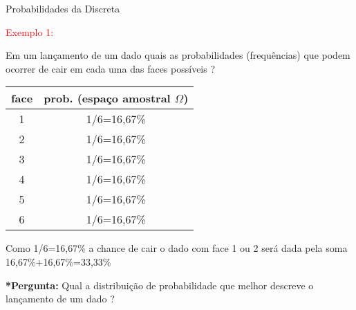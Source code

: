 \documentclass{beamer}
\begin{document}
\begin{frame}{Probabilidades da Discreta}\label{dado}

\footnotesize

\vspace{-.5cm}
\textcolor{red}{Exemplo 1:}

Em um lançamento de um dado quais as probabilidades (frequências) que podem ocorrer de cair em cada uma das faces possíveis ?

\begin{table}[htbp]
  \centering
    \begin{tabular}{cc}
    \textbf{face} & \textbf{prob. (espaço amostral $\Omega$)} \\
    \hline
    1     &  1/6=16,67\% \\
    2     &  1/6=16,67\% \\
    3     &  1/6=16,67\% \\
    4     &  1/6=16,67\% \\
    5     &  1/6=16,67\% \\
    6     &  1/6=16,67\% \\
    \hline
    \end{tabular}%
  \label{tab:addlabel}%
\end{table}%

Como 1/6=16,67\% a chance de cair o dado com face 1 ou 2 será dada pela soma 16,67\%+16,67\%=33,33\%

\vspace{.25cm}
\textbf{*Pergunta:} Qual a distribuição de probabilidade que melhor descreve o lançamento de um dado ? %
\end{frame}

\end{document}
